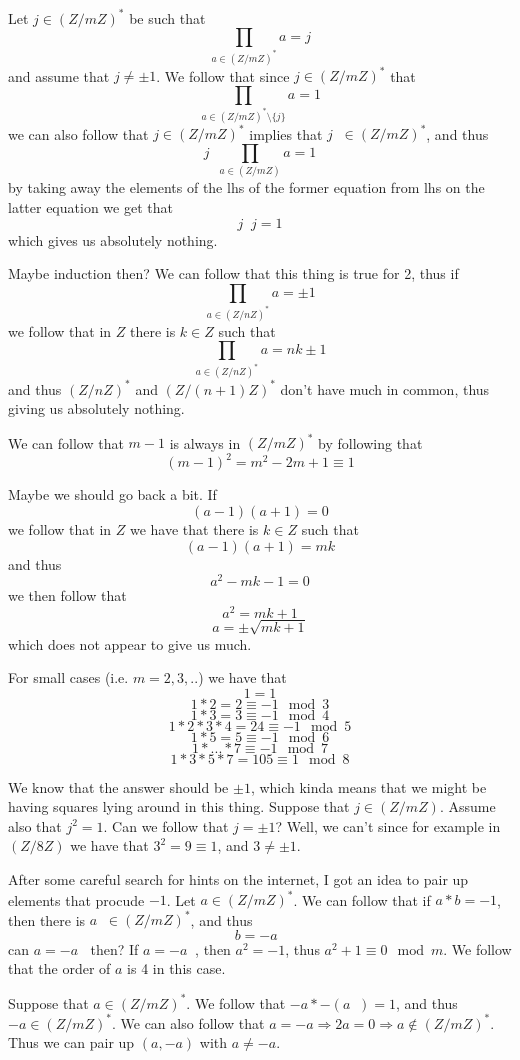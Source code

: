 \documentclass[11pt,oneside,titlepage]{book}
\DeclareMathOperator \inv {^{-1}}
\DeclareMathOperator \ra {\Rightarrow}
\newcommand{\set}[1]{\{ #1 \}}
\begin{document}
Let $j \in (Z/mZ)^*$ be such that
$$\prod_{a \in (Z/mZ)^*}a = j$$
and assume that $j \neq \pm 1$. We follow that since $j \in (Z/mZ)^*$
that
$$\prod_{a \in (Z/mZ)^* \setminus \set{j}}a = 1$$
we can also follow that $j \in (Z/mZ)^*$ implies that $j\inv \in
(Z/mZ)^*$, and thus
$$j\inv \prod_{a \in (Z/mZ)}a = 1$$
by taking away the elements of the lhs of the former equation from lhs
on the latter equation we get that
$$j\inv j = 1$$
which gives us absolutely nothing.

Maybe induction then? We can follow that this thing is true for 2,
thus if
$$\prod_{a \in (Z/nZ)^*}a = \pm 1$$
we follow that in $Z$ there is $k \in Z$ such that
$$\prod_{a \in (Z/nZ)^*}a = nk \pm 1$$
and thus $(Z/nZ)^*$ and $(Z/(n + 1)Z)^*$ don't have much in common,
thus giving us absolutely nothing.

We can follow that $m - 1$ is always in $(Z/mZ)^*$ by following that
$$(m - 1)^2 = m^2 - 2m + 1 \equiv 1$$

Maybe we should go back a bit. If
$$(a - 1) (a + 1) = 0$$
we follow that in $Z$ we have that there is $k \in Z$ such that
$$(a - 1) (a + 1) = mk$$
and thus
$$a^2 - mk - 1 = 0$$
we then follow that
$$a^2 = mk + 1$$
$$a = \pm \sqrt{mk + 1}$$
which does not appear to give us much.

For small cases (i.e. $m = 2, 3, ..$) we have that
$$1 = 1$$
$$1 * 2 = 2 \equiv -1 \mod 3$$
$$1 * 3 = 3 \equiv -1 \mod 4$$
$$1 * 2 * 3 * 4 = 24 \equiv -1 \mod 5$$
$$1 * 5 = 5 \equiv -1 \mod 6$$
$$1 * ... *  7  \equiv -1 \mod 7$$
$$1 * 3 * 5 * 7 = 105  \equiv 1 \mod 8$$

We know that the answer should be $\pm 1$, which kinda means that we
might be having squares lying around in this thing.  Suppose that $j
\in (Z/mZ)$. Assume also that $j^2 = 1$. Can we follow that $j = \pm
1$? Well, we can't since for example in $(Z/8Z)$ we have that $3^2 = 9
\equiv 1$, and $3 \neq \pm 1$.

After some careful search for hints on the internet, I got an idea to
pair up elements that procude $-1$. Let $a \in (Z/mZ)^*$. We can
follow that if $a * b = -1$, then there is $a\inv \in (Z/mZ)^*$, and
thus
$$b = -a\inv$$
can $a = -a\inv$ then? If $a = -a\inv$, then $a^2 = -1$, thus $a^2 + 1
\equiv 0 \mod m$. We follow that the order of $a$ is 4 in this case.

Suppose that $a \in (Z/mZ)^*$. We follow that $-a * -(a\inv) = 1$, and
thus $-a \in (Z/mZ)^*$. We can also follow that $a = -a \ra 2a = 0 \ra
a \notin (Z/mZ)^*$. Thus we can pair up $(a, -a)$ with $a \neq -a$.
\end{document}
